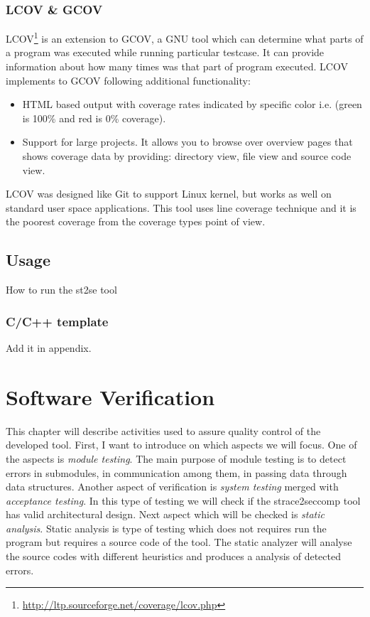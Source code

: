 \subsection{LCOV \& GCOV}
LCOV\footnote{\url{http://ltp.sourceforge.net/coverage/lcov.php}} is an extension to GCOV, a GNU tool which can determine what parts of a program was executed while running particular testcase.
It can provide information about how many times was that part of program executed.
LCOV implements to GCOV following additional functionality:
\begin{itemize}
	\item HTML based output with coverage rates indicated by specific color i.e. (green is 100\% and red is 0\% coverage).
	\item Support for large projects. It allows you to browse over overview pages that shows coverage data
	by providing: directory view, file view and source code view.
\end{itemize}
LCOV was designed like Git to support Linux kernel, but works as well on standard user space applications.
This tool uses line coverage technique and it is the poorest coverage from the coverage types point of view.


\section{Usage}
How to run the st2se tool

\subsection{C/C++ template}
Add it in appendix.

\chapter{Software Verification}
This chapter will describe activities used to assure quality control of the developed tool.
First, I want to introduce on which aspects we will focus.
One of the aspects is \textit{module testing}.
The main purpose of module testing is to detect errors in submodules, in communication among them, in passing data through data structures.
Another aspect of verification is \textit{system testing} merged with \textit{acceptance testing}.
In this type of testing we will check if the strace2seccomp tool has valid architectural design.
Next aspect which will be checked is \textit{static analysis}.
Static analysis is type of testing which does not requires run the program but requires a source code of the tool.
The static analyzer will analyse the source codes with different heuristics and produces a analysis of detected errors. %



